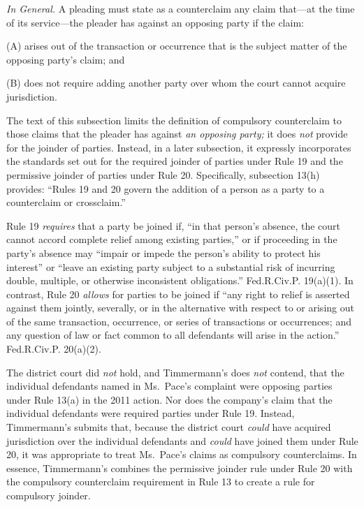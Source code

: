 \documentclass[11pt,letterpaper,twoside]{article}
\renewenvironment{quote}{%
   \list{}{%
     \leftmargin2em   %
     \rightmargin\leftmargin\parsep .1em }
   \item\relax
}
{\endlist}
\begin{document}
\begin{quote}
\emph{In General.} A pleading must state as a counterclaim any claim
that---at the time of its service---the pleader has against an opposing
party if the claim:

(A) arises out of the transaction or occurrence that is the subject
matter of the opposing party's claim; and

(B) does not require adding another party over whom the court cannot
acquire jurisdiction.
\end{quote}

The text of this subsection limits the definition of compulsory
counterclaim to those claims that the pleader has against \emph{an
opposing party;} it does \emph{not} provide for the joinder of parties.
Instead, in a later subsection, it expressly incorporates the standards
set out for the required joinder of parties under Rule 19 and the
permissive joinder of parties under Rule 20. Specifically, subsection
13(h) provides: ``Rules 19 and 20 govern the addition of a person as a
party to a counterclaim or crossclaim.''

Rule 19 \emph{requires} that a party be joined if, ``in that person's
absence, the court cannot accord complete relief among existing
parties,'' or if proceeding in the party's absence may ``impair or
impede the person's ability to protect his interest'' or ``leave an
existing party subject to a substantial risk of incurring double,
multiple, or otherwise inconsistent obligations.'' Fed.R.Civ.P.
19(a)(1). In contrast, Rule 20 \emph{allows} for parties to be joined if
``any right to relief is asserted against them jointly, severally, or in
the alternative with respect to or arising out of the same transaction,
occurrence, or series of transactions or occurrences; and any question
of law or fact common to all defendants will arise in the action.''
Fed.R.Civ.P. 20(a)(2).

The district court did \emph{not} hold, and Timmermann's does \emph{not}
contend, that the individual defendants named in Ms.~Pace's complaint
were opposing parties under Rule 13(a) in the 2011 action. Nor does the
company's claim that the individual defendants were required parties
under Rule 19. Instead, Timmermann's submits that, because the district
court \emph{could} have acquired jurisdiction over the individual
defendants and \emph{could} have joined them under Rule 20, it was
appropriate to treat Ms.~Pace's claims as compulsory counterclaims. In
essence, Timmermann's combines the permissive joinder rule under Rule 20
with the compulsory counterclaim requirement in Rule 13 to create a rule
for compulsory joinder.
\end{document}

